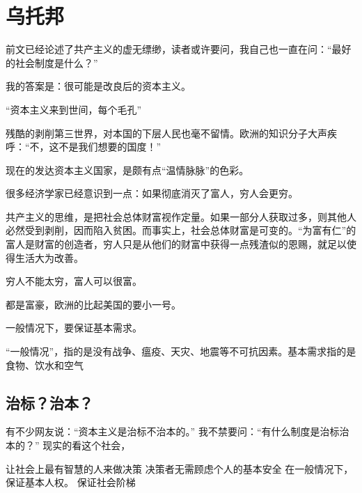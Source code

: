 \chapter{乌托邦}

前文已经论述了共产主义的虚无缥缈，读者或许要问，我自己也一直在问：“最好的社会制度是什么？”

我的答案是：很可能是改良后的资本主义。

“资本主义来到世间，每个毛孔”

残酷的剥削第三世界，对本国的下层人民也毫不留情。欧洲的知识分子大声疾呼：“不，这不是我们想要的国度！”

现在的发达资本主义国家，是颇有点“温情脉脉”的色彩。

很多经济学家已经意识到一点：如果彻底消灭了富人，穷人会更穷。

共产主义的思维，是把社会总体财富视作定量。如果一部分人获取过多，则其他人必然受到剥削，因而陷入贫困。而事实上，社会总体财富是可变的。“为富有仁”的富人是财富的创造者，穷人只是从他们的财富中获得一点残渣似的恩赐，就足以使得生活大为改善。

穷人不能太穷，富人可以很富。

都是富豪，欧洲的比起美国的要小一号。

一般情况下，要保证基本需求。

“一般情况”，指的是没有战争、瘟疫、天灾、地震等不可抗因素。基本需求指的是食物、饮水和空气



\section{治标？治本？}
有不少网友说：“资本主义是治标不治本的。”
我不禁要问：“有什么制度是治标治本的？”
现实的看这个社会，

让社会上最有智慧的人来做决策
决策者无需顾虑个人的基本安全
在一般情况下，保证基本人权。 
保证社会阶梯